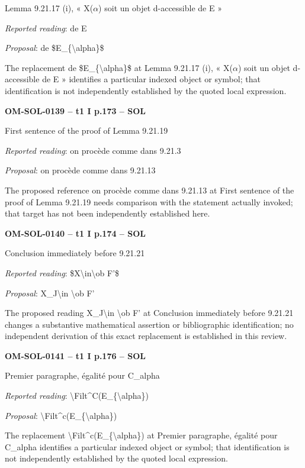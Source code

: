 Lemma 9.21.17 (i), « X(\ensuremath{\alpha}) soit un objet d-accessible de E »\par
\emph{Reported reading}: de E\par
\emph{Proposal}: de \$E\_\{\textbackslash{}alpha\}\$\par
The replacement de \$E\_\{\textbackslash{}alpha\}\$ at Lemma 9.21.17 (i), « X(\ensuremath{\alpha}) soit un objet d-accessible de E » identifies a particular indexed object or symbol; that identification is not independently established by the quoted local expression.\par
\par\noindent\textbf{OM-SOL-0139 -- t1 I p.173 -- SOL}\par
First sentence of the proof of Lemma 9.21.19\par
\emph{Reported reading}: on procède comme dans 9.21.3\par
\emph{Proposal}: on procède comme dans 9.21.13\par
The proposed reference on procède comme dans 9.21.13 at First sentence of the proof of Lemma 9.21.19 needs comparison with the statement actually invoked; that target has not been independently established here.\par
\par\noindent\textbf{OM-SOL-0140 -- t1 I p.174 -- SOL}\par
Conclusion immediately before 9.21.21\par
\emph{Reported reading}: \$X\textbackslash{}in\textbackslash{}ob F'\$\par
\emph{Proposal}: X\_J\textbackslash{}in \textbackslash{}ob F'\par
The proposed reading X\_J\textbackslash{}in \textbackslash{}ob F' at Conclusion immediately before 9.21.21 changes a substantive mathematical assertion or bibliographic identification; no independent derivation of this exact replacement is established in this review.\par
\par\noindent\textbf{OM-SOL-0141 -- t1 I p.176 -- SOL}\par
Premier paragraphe, égalité pour C\_alpha\par
\emph{Reported reading}: \textbackslash{}Filt\textasciicircum{}C(E\_\{\textbackslash{}alpha\})\par
\emph{Proposal}: \textbackslash{}Filt\textasciicircum{}c(E\_\{\textbackslash{}alpha\})\par
The replacement \textbackslash{}Filt\textasciicircum{}c(E\_\{\textbackslash{}alpha\}) at Premier paragraphe, égalité pour C\_alpha identifies a particular indexed object or symbol; that identification is not independently established by the quoted local expression.\par
